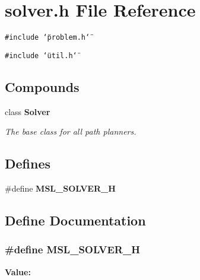\section{solver.h File Reference}
\label{solver_8h}
{\tt \#include \char`\"{}problem.h\char`\"{}}\par
{\tt \#include \char`\"{}util.h\char`\"{}}\par
\subsection*{Compounds}
\begin{CompactItemize}
\item 
class {\bf Solver}
\begin{CompactList}\small\item\em The base class for all path planners.\item\end{CompactList}\end{CompactItemize}
\subsection*{Defines}
\begin{CompactItemize}
\item 
\#define {\bf MSL\_\-SOLVER\_\-H}
\end{CompactItemize}


\subsection{Define Documentation}
\subsubsection{\setlength{\rightskip}{0pt plus 5cm}\#define MSL\_\-SOLVER\_\-H}\label{solver_8h_a0}


{\bf Value:}\footnotesize\begin{verbatim}
\end{verbatim}\normalsize 
